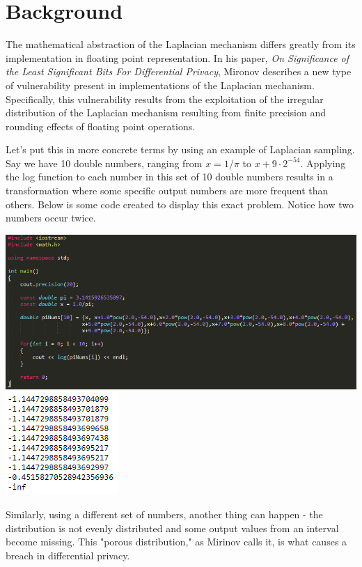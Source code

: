 \documentclass[11pt]{exam}
\begin{document}
 
 

\thispagestyle{head} %


\section{Background}

The mathematical abstraction of the Laplacian mechanism differs greatly from its implementation in floating point representation.  In his paper, \textit{On Significance of the Least Significant Bits For Differential Privacy}, Mironov describes a new type of vulnerability present in implementations of the Laplacian mechanism. Specifically, this vulnerability results from the exploitation of the irregular distribution of the Laplacian mechanism resulting from finite precision and rounding effects of floating point operations.

Let's put this in more concrete terms by using an example of Laplacian sampling.  Say we have 10 double numbers, ranging from $x = 1/ \pi$ to $x+9 \cdot 2^{-54}$.  Applying the log function to each number in this set of 10 double numbers results in a transformation where some specific output numbers are more frequent than others.  Below is some code created to display this exact problem.  Notice how two numbers occur twice.

\includegraphics[width=\textwidth]{code.PNG}
\includegraphics{result.PNG}

Similarly, using a different set of numbers, another thing can happen - the distribution is not evenly distributed and some output values from an interval become missing.  This "porous distribution," as Mirinov calls it, is what causes a breach in differential privacy.
\end{document}
